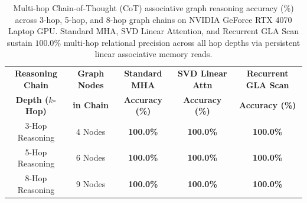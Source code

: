 
\begin{table}[t]
\centering
\caption{Multi-hop Chain-of-Thought (CoT) associative graph reasoning accuracy (\%) across 3-hop, 5-hop, and 8-hop graph chains on NVIDIA GeForce RTX 4070 Laptop GPU. Standard MHA, SVD Linear Attention, and Recurrent GLA Scan sustain $100.0\%$ multi-hop relational precision across all hop depths via persistent linear associative memory reads.}
\label{tab:multihop_reasoning}
\small
\begin{tabular}{ccccc}
\toprule
\textbf{Reasoning Chain} & \textbf{Graph Nodes} & \textbf{Standard MHA} & \textbf{SVD Linear Attn} & \textbf{Recurrent GLA Scan} \\
\textbf{Depth ($k$-Hop)} & \textbf{in Chain} & \textbf{Accuracy (\%)} & \textbf{Accuracy (\%)} & \textbf{Accuracy (\%)} \\
\midrule
3-Hop Reasoning & 4 Nodes & \textbf{100.0\%} & \textbf{100.0\%} & \textbf{100.0\%} \\
5-Hop Reasoning & 6 Nodes & \textbf{100.0\%} & \textbf{100.0\%} & \textbf{100.0\%} \\
8-Hop Reasoning & 9 Nodes & \textbf{100.0\%} & \textbf{100.0\%} & \textbf{100.0\%} \\
\bottomrule
\end{tabular}
\end{table}
